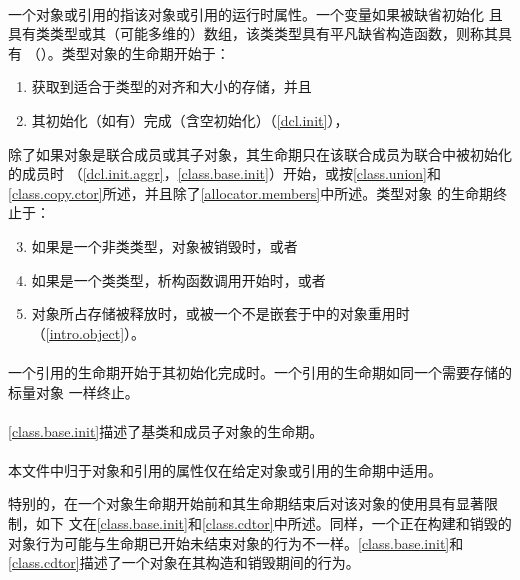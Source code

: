 \paragraph{} %
一个对象或引用的指该对象或引用的运行时属性。一个变量如果被缺省初始化
且具有类类型或其（可能多维的）数组，该类类型具有平凡缺省构造函数，则称其具有
（）。类型对象的生命期开始于：
\begin{enumerate}
  \item 获取到适合于类型的对齐和大小的存储，并且
  \item 其初始化（如有）完成（含空初始化）（\ref{dcl.init}），
\end{enumerate}
除了如果对象是联合成员或其子对象，其生命期只在该联合成员为联合中被初始化的成员时
（\ref{dcl.init.aggr}，\ref{class.base.init}）开始，或按\ref{class.union}和
\ref{class.copy.ctor}所述，并且除了\ref{allocator.members}中所述。类型对象
的生命期终止于：
\begin{enumerate}
  \setcounter{enumi}{2}
  \item 如果是一个非类类型，对象被销毁时，或者
  \item 如果是一个类类型，析构函数调用开始时，或者
  \item 对象所占存储被释放时，或被一个不是嵌套于中的对象重用时
        （\ref{intro.object}）。
\end{enumerate}

\paragraph{} %
一个引用的生命期开始于其初始化完成时。一个引用的生命期如同一个需要存储的标量对象
一样终止。

\paragraph{} %
\begin{note}
  \ref{class.base.init}描述了基类和成员子对象的生命期。
\end{note}

\paragraph{} %
本文件中归于对象和引用的属性仅在给定对象或引用的生命期中适用。

\begin{note}
  特别的，在一个对象生命期开始前和其生命期结束后对该对象的使用具有显著限制，如下
  文在\ref{class.base.init}和\ref{class.cdtor}中所述。同样，一个正在构建和销毁的
  对象行为可能与生命期已开始未结束对象的行为不一样。\ref{class.base.init}和
  \ref{class.cdtor}描述了一个对象在其构造和销毁期间的行为。
\end{note}

